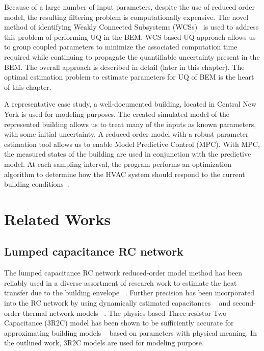 Because of a large number of input parameters, despite the use of reduced order model, the resulting filtering problem is computationally expensive. The novel method of identifying Weakly Connected Subsystems (WCSs)~\citep{mukherjee2015laplacian,mukherjee2015non} is used to address this problem of performing UQ in the BEM. WCS-based UQ approach allows us to group coupled parameters to minimize the associated computation time required while continuing to propagate the quantifiable uncertainty present in the BEM. The overall approach is described in detail (later in this chapter). The optimal estimation problem to estimate parameters for UQ of BEM is the heart of this chapter.

A representative case study, a well-documented building, located in Central New York is used for modeling purposes. The created simulated model of the represented building allows us to treat many of the inputs as known parameters, with some initial uncertainty. 
A reduced order model with a robust parameter estimation tool allows us to enable Model Predictive Control (MPC).  With MPC, the measured states of the building are used in conjunction with the predictive model.  At each sampling interval, the program performs an optimization algorithm to determine how the HVAC system should respond to the current building conditions~\citep{kelman2013analysis}.

\section{Related Works}
\label{literature}
\subsection{Lumped capacitance RC network }
The lumped capacitance RC network reduced-order model method has been reliably used in a diverse assortment of research work to estimate the heat transfer due to the building envelope ~\citep{ramallo2013lumped,vsiroky2011experimental,li2017development}.  Further precision has been incorporated into the RC network by using dynamically estimated capacitances ~\citep{jara2016new} and second-order thermal network models ~\citep{underwood2014improved}.  The physics-based Three resistor-Two Capacitance (3R2C) model has been shown to be sufficiently accurate for approximating building models ~\citep{kircher2015lumped} based on parameters with physical meaning. In the outlined work, 3R2C models are used for modeling purpose.

